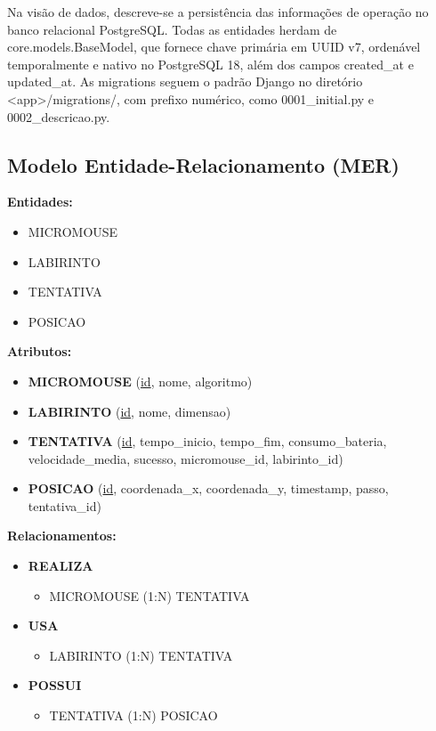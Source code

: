     Na visão de dados, descreve-se a persistência das informações de operação no banco relacional PostgreSQL. Todas as entidades herdam de core.models.BaseModel, que fornece chave primária em UUID v7, ordenável temporalmente e nativo no PostgreSQL 18, além dos campos created\_at e updated\_at. As migrations seguem o padrão Django no diretório \textless{}app\textgreater{}/migrations/, com prefixo numérico, como 0001\_initial.py e 0002\_descricao.py.
    

\subsection{Modelo Entidade-Relacionamento (MER)}

\textbf{Entidades:}

\begin{itemize}
    \item MICROMOUSE
    \item LABIRINTO
    \item TENTATIVA
    \item POSICAO
\end{itemize}

\vspace{0.5cm}

\textbf{Atributos:}

\begin{itemize}
    \item \textbf{MICROMOUSE} (\underline{id}, nome, algoritmo)

    \item \textbf{LABIRINTO} (\underline{id}, nome, dimensao)

    \item \textbf{TENTATIVA} (\underline{id}, tempo\_inicio, tempo\_fim, consumo\_bateria, velocidade\_media, sucesso, micromouse\_id, labirinto\_id)

    \item \textbf{POSICAO} (\underline{id}, coordenada\_x, coordenada\_y, timestamp, passo, tentativa\_id)
\end{itemize}

\vspace{0.5cm}

\textbf{Relacionamentos:}

\begin{itemize}
    \item \textbf{REALIZA}
    \begin{itemize}
        \item MICROMOUSE (1:N) TENTATIVA
    \end{itemize}

    \item \textbf{USA}
    \begin{itemize}
        \item LABIRINTO (1:N) TENTATIVA
    \end{itemize}

    \item \textbf{POSSUI}
    \begin{itemize}
        \item TENTATIVA (1:N) POSICAO
    \end{itemize}
\end{itemize}

